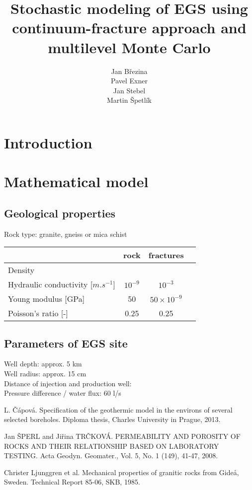 \documentclass{article}
\title{Stochastic modeling of EGS using continuum-fracture approach and multilevel Monte Carlo}
\author{
  Jan Březina \\
  \And
  Pavel Exner \\
  \And
  Jan Stebel \\
  \And
  Martin Špetlík \\
}
\begin{document}
\maketitle

\begin{abstract}

\end{abstract}




\section{Introduction}



\section{Mathematical model}

\subsection{Geological properties}

Rock type: granite, gneiss or mica schist \cite{capova} %

\begin{tabular}{|l|c|c|c|}
\hline
 & rock & fractures \\\hline
Density & & \\
Hydraulic conductivity [$m.s^{-1}$] & $10^{-9}$ \cite{sperl-trckova} & $10^{-3}$ \\
Young modulus [GPa] & 50 \cite{ljunggren} & $50\times 10^{-9}$ \\
Poisson's ratio [-] & 0.25 \cite{ljunggren} & 0.25 \\
\hline
\end{tabular}

\subsection{Parameters of EGS site}

Well depth: approx. 5 km\\
Well radius: approx. 15 cm\\
Distance of injection and production well: \\
Pressure difference / water flux: 60 l/s



\begin{thebibliography}{9}

 L. Čápová. Specification of the geothermic model in the
environs of several selected boreholes. Diploma thesis, Charles University in Prague, 2013.

 Jan ŠPERL and Jiřina TRČKOVÁ. PERMEABILITY AND POROSITY OF ROCKS AND THEIR RELATIONSHIP BASED ON LABORATORY TESTING. Acta Geodyn. Geomater., Vol. 5, No. 1 (149), 41-47, 2008.

 Christer  Ljunggren et al. Mechanical properties of granitic rocks from Gide\aa, Sweden. Technical Report 85-06, SKB, 1985.

\end{thebibliography}
\end{document}
